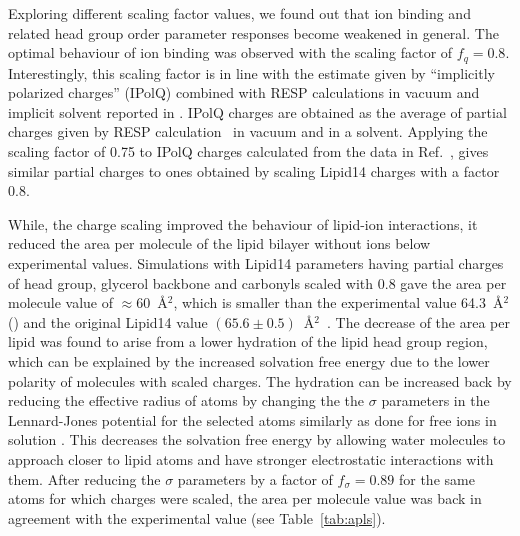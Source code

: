 \documentclass[aip,jcp,twocolumn]{revtex4}
\begin{document}
Exploring different scaling factor values, we found out that ion binding and
related head group order parameter responses become weakened in general. 
The optimal behaviour of ion binding was observed with
the scaling factor of $f_q = 0.8$. %
Interestingly, this scaling factor is in line with the estimate
given by ``implicitly polarized charges'' (IPolQ) \cite{ipolq2013}
combined with RESP calculations in vacuum and implicit solvent reported
in \cite{maciejewski14}. IPolQ charges are obtained as the average of
partial charges given by RESP calculation~\cite{RESP_paper}
in vacuum and in a solvent. Applying the scaling factor of 0.75 to
IPolQ charges calculated from the data in Ref.~\cite{maciejewski14},
gives similar partial charges to ones obtained by scaling Lipid14 charges
with a factor 0.8.


While, the charge scaling improved the behaviour of lipid-ion interactions,
it reduced the area per molecule of the lipid bilayer without ions below experimental
values. Simulations with Lipid14 parameters having partial charges of head group, glycerol
backbone and carbonyls scaled with 0.8 gave the area per molecule value of $\approx$60~\AA$^2$,
which is smaller than the experimental value 64.3~\AA$^2$ (\cite{})
and the original Lipid14 value $(65.6 \pm 0.5)$~\AA$^2$~\cite{dickson14}.
The decrease of the area per lipid was found to arise from a lower hydration of the lipid head group region,
which can be explained by the increased solvation free energy due to the lower polarity
of molecules with scaled charges. The hydration can be increased back
by reducing the effective radius of atoms by changing the 
the $\sigma$ parameters in the Lennard-Jones potential for the selected atoms
similarly as done for free ions in solution \cite{kohagen14,kohagen16,Pluharova2014}.
This decreases the solvation free energy by allowing water molecules to
approach closer to lipid atoms and have stronger electrostatic interactions with them.
After reducing the $\sigma$ parameters by a factor of $f_\sigma = 0.89$
for the same atoms for which charges were scaled, the area per molecule value was
back in agreement with the experimental value (see Table~\ref{tab:apls}). 
\end{document}
